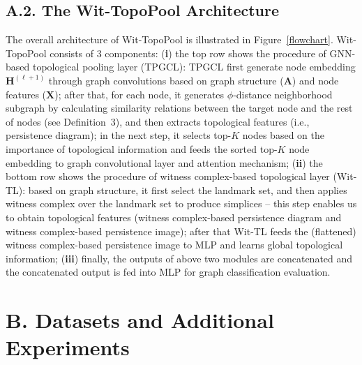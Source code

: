 \documentclass[letterpaper]{article} %
\begin{document}
\subsection{A.2. The Wit-TopoPool Architecture}
The overall architecture of Wit-TopoPool is illustrated in Figure~\ref{flowchart}. Wit-TopoPool consists of 3 components: ({\bf i}) the top row shows the procedure of GNN-based topological pooling layer (TPGCL): TPGCL first generate node embedding $\boldsymbol{H}^{(\ell + 1)}$ through graph convolutions based on graph structure ($\boldsymbol{A}$) and node features ($\boldsymbol{X}$); after that, for each node, it generates $\phi$-distance neighborhood subgraph by calculating similarity relations between the target node and the rest of nodes (see Definition~3), and then extracts topological features (i.e., persistence diagram); in the next step, it selects top-$K$ nodes based on the importance of topological information and feeds the sorted top-$K$ node embedding to graph convolutional layer and attention mechanism; ({\bf ii}) the bottom row shows the procedure of witness complex-based topological layer (Wit-TL): based on graph structure, it first select the landmark set, and then applies witness complex over the landmark set to produce simplices -- this step enables us to obtain topological features (witness complex-based persistence diagram and witness complex-based persistence image); after that Wit-TL feeds the (flattened) witness complex-based persistence image to MLP and learns global topological information; ({\bf iii}) finally, the outputs of above two modules are concatenated and the concatenated output is fed into MLP for graph classification evaluation.

\section{B. Datasets and Additional Experiments}
\begin{table}[h!]
\centering
{}
\caption{Summary statistics of the benchmark datasets.\label{tab:datasets}}
\end{table}
\end{document}
